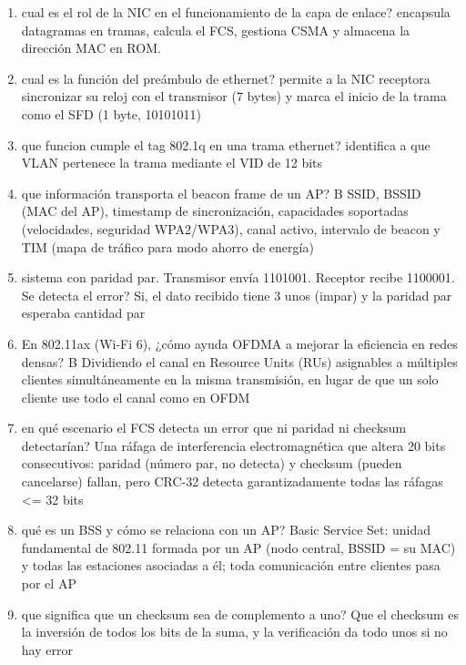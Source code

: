 \begin{enumerate}
\item cual es el rol de la NIC en el funcionamiento de la capa de enlace?
encapsula datagramas en tramas, calcula el FCS, gestiona CSMA y almacena la dirección MAC en ROM.

\item cual es la función del preámbulo de ethernet?
permite a la NIC receptora sincronizar su reloj con el transmisor (7 bytes) y marca el inicio de la trama como el SFD (1 byte, 10101011)

\item que funcion cumple el tag 802.1q en una trama ethernet?
identifica a que VLAN pertenece la trama mediante el VID de 12 bits

\item que información transporta el beacon frame de un AP?
B
SSID, BSSID (MAC del AP), timestamp de sincronización, capacidades soportadas (velocidades, seguridad WPA2/WPA3), canal activo, intervalo de beacon y TIM (mapa de tráfico para modo ahorro de energía)

\item sistema con paridad par. Transmisor envía 1101001. Receptor recibe 1100001. Se detecta el error?
Si, el dato recibido tiene 3 unos (impar) y la paridad par esperaba cantidad par

\item En 802.11ax (Wi-Fi 6), ¿cómo ayuda OFDMA a mejorar la eficiencia en redes densas?
B
Dividiendo el canal en Resource Units (RUs) asignables a múltiples clientes simultáneamente en la misma transmisión, en lugar de que un solo cliente use todo el canal como en OFDM

\item en qué escenario el FCS detecta un error que ni paridad ni checksum detectarían?
Una ráfaga de interferencia electromagnética que altera 20 bits consecutivos: paridad (número par, no detecta) y checksum (pueden cancelarse) fallan, pero CRC-32 detecta garantizadamente todas las ráfagas <= 32 bits

\item qué es un BSS y cómo se relaciona con un AP?
Basic Service Set: unidad fundamental de 802.11 formada por un AP (nodo central, BSSID = su MAC) y todas las estaciones asociadas a él; toda comunicación entre clientes pasa por el AP

\item que significa que un checksum sea de complemento a uno?
Que el checksum es la inversión de todos los bits de la suma, y la verificación da todo unos si no hay error


\end{enumerate}
